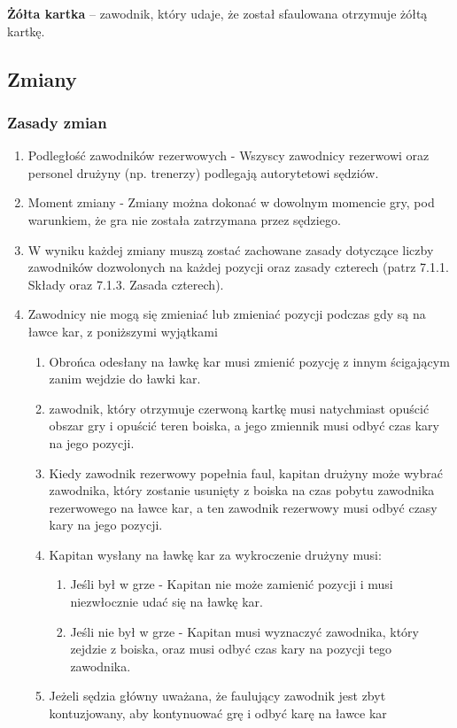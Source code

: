\documentclass[12pt]{article}
\newcommand\yellowcard[1]{\bgroup\textcolor{darkyellow}{\textbf{#1}}}
\begin{document}
\yellowcard{Żółta kartka} -- zawodnik, który udaje, że został sfaulowana
otrzymuje żółtą kartkę.

\subsection{Zmiany}

\subsubsection{Zasady zmian}

\begin{enumerate}
	\item
	      Podległość zawodników rezerwowych - Wszyscy zawodnicy
	      rezerwowi oraz personel drużyny (np. trenerzy) podlegają autorytetowi
	      sędziów.
	\item
	      Moment zmiany - Zmiany można dokonać w dowolnym momencie gry,
	      pod warunkiem, że gra nie została zatrzymana przez sędziego.
	\item
	      W wyniku każdej zmiany muszą zostać zachowane zasady dotyczące liczby
	      zawodników dozwolonych na każdej pozycji oraz zasady czterech (patrz
	      7.1.1. Składy oraz 7.1.3. Zasada czterech).
	\item
	      Zawodnicy nie mogą się zmieniać lub zmieniać pozycji podczas gdy są na
	      ławce kar, z poniższymi wyjątkami

	      \begin{enumerate}
		      \item
		            Obrońca odesłany na ławkę kar musi zmienić pozycję z innym
		            ścigającym zanim wejdzie do ławki kar.
		      \item
		            zawodnik, który otrzymuje czerwoną kartkę musi natychmiast opuścić
		            obszar gry i opuścić teren boiska, a jego zmiennik musi odbyć czas
		            kary na jego pozycji.
		      \item
		            Kiedy zawodnik rezerwowy popełnia faul, kapitan drużyny może wybrać
		            zawodnika, który zostanie usunięty z boiska na czas pobytu zawodnika
		            rezerwowego na ławce kar, a ten zawodnik rezerwowy musi odbyć czasy
		            kary na jego pozycji.
		      \item
		            Kapitan wysłany na ławkę kar za wykroczenie drużyny musi:

		            \begin{enumerate}
			            \item
			                  Jeśli był w grze - Kapitan nie może zamienić pozycji i musi
			                  niezwłocznie udać się na ławkę kar.
			            \item
			                  Jeśli nie był w grze - Kapitan musi wyznaczyć zawodnika, który
			                  zejdzie z boiska, oraz musi odbyć czas kary na pozycji tego
			                  zawodnika.
		            \end{enumerate}
		      \item
		            Jeżeli sędzia główny uważana, że faulujący zawodnik jest zbyt
		            kontuzjowany, aby kontynuować grę i odbyć karę na ławce kar


\end{enumerate}
\end{enumerate}
\end{document}
